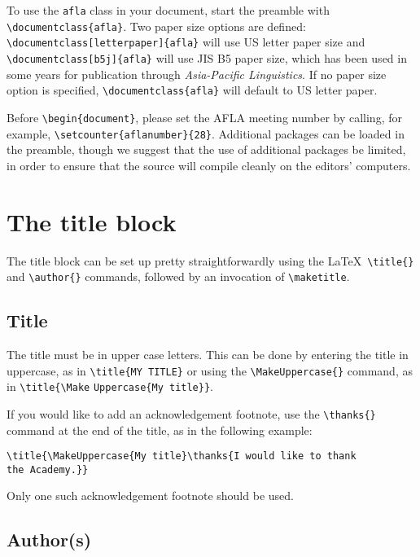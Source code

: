 \documentclass{afla}
\begin{document}
To use the \verb`afla` class in your document, start the preamble with \verb`\documentclass{afla}`. Two paper size options are defined: \verb`\documentclass[letterpaper]{afla}` will use US letter paper size and \verb`\documentclass[b5j]{afla}` will use JIS B5 paper size, which has been used in some years for publication through \textit{Asia-Pacific Linguistics}. If no paper size option is specified, \verb`\documentclass{afla}` will default to US letter paper.

Before \verb`\begin{document}`, please set the AFLA meeting number by calling, for example, \verb`\setcounter{aflanumber}{28}`. Additional packages can be loaded in the preamble, though we suggest that the use of additional packages be limited, in order to ensure that the source will compile cleanly on the editors' computers.



\section{The title block}

The title block can be set up pretty straightforwardly using the \LaTeX\ \verb`\title{}` and \verb`\author{}` commands, followed by an invocation of \verb`\maketitle`.

\subsection{Title}

The title must be in upper case letters. This can be done by entering the title in uppercase, as in \verb`\title{MY TITLE}` or using the \verb`\MakeUppercase{}` command, as in \verb`\title{\Make` \verb`Uppercase{My title}}`.

If you would like to add an acknowledgement footnote, use the \verb`\thanks{}` command at the end of the title, as in the following example:

\ex \tt \verb`\title{\MakeUppercase{My title}\thanks{`I would like to thank\\ the Academy.\verb`}}`
\xe
\

\noindent Only one such acknowledgement footnote should be used.

\subsection{Author(s)}
\end{document}

